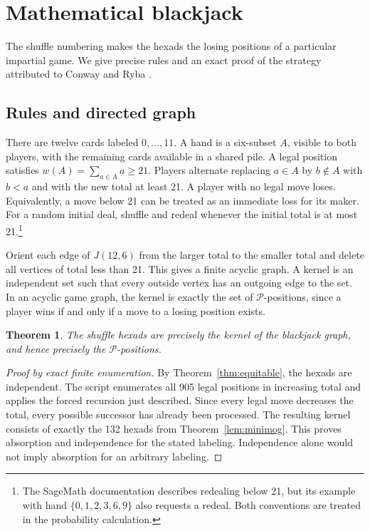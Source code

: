 \documentclass[12pt,letterpaper]{article}
\newtheorem{theorem}{Theorem}[section]
\theoremstyle{definition}\newtheorem{example}[theorem]{Example}
\numberwithin{equation}{section}
\begin{document}
\section{Mathematical blackjack}\label{sec:game}
The shuffle numbering makes the hexads the losing positions of a particular impartial game. We give precise rules and an exact proof of the strategy attributed to Conway and Ryba \cite{CS86,KR01}.

\subsection{Rules and directed graph}
There are twelve cards labeled $0,\ldots,11$. A hand is a six-subset $A$, visible to both players, with the remaining cards available in a shared pile. A legal position satisfies $w(A)=\sum_{a\in A}a\ge21$. Players alternate replacing $a\in A$ by $b\notin A$ with $b<a$ and with the new total at least 21. A player with no legal move loses. Equivalently, a move below 21 can be treated as an immediate loss for its maker. For a random initial deal, shuffle and redeal whenever the initial total is at most 21.\footnote{The SageMath documentation \cite{Jo06} describes redealing below 21, but its example with hand $\{0,1,2,3,6,9\}$ also requests a redeal. Both conventions are treated in the probability calculation.}

Orient each edge of $J(12,6)$ from the larger total to the smaller total and delete all vertices of total less than 21. This gives a finite acyclic graph. A kernel is an independent set such that every outside vertex has an outgoing edge to the set. In an acyclic game graph, the kernel is exactly the set of $\mathcal P$-positions, since a player wins if and only if a move to a losing position exists.

\begin{theorem}\label{thm:game}
The shuffle hexads are precisely the kernel of the blackjack graph, and hence precisely the $\mathcal P$-positions.
\end{theorem}

\begin{proof}[Proof by exact finite enumeration]
By Theorem~\ref{thm:equitable}, the hexads are independent. The script enumerates all 905 legal positions in increasing total and applies the forced recursion just described. Since every legal move decreases the total, every possible successor has already been processed. The resulting kernel consists of exactly the 132 hexads from Theorem~\ref{lem:minimog}. This proves absorption and independence for the stated labeling. Independence alone would not imply absorption for an arbitrary labeling.
\end{proof}
\end{document}
